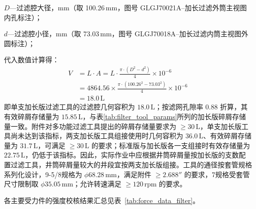 $D$---过滤腔大径，mm（取 100.26\,mm，图号 GLGJ70021A--加长过滤外筒主视图内孔标注）；

$d$---过滤腔小径，mm（取 73.03\,mm，图号 GLGJ70018A--加长过滤内筒主视图外圆标注）；


代入数值计算得：
\begin{equation}
    \begin{aligned}
        V &= L \cdot A = L \cdot \frac{\pi \cdot (D^2 - d^2)}{4} \times 10^{-6} \\
        &= 4864.56 \times \frac{\pi \cdot (100.26^2 - 73.03^2)}{4} \times 10^{-6} \\
        &= 18.0\,\text{L}
    \end{aligned}
\end{equation}
即单支加长版过滤工具的过滤腔几何容积为 $18.0\,\text{L}$；按滤网孔隙率 $0.88$ 折算，其有效碎屑存储量为 $15.85\,\text{L}$，与表\ref{tab:filter_tool_params}所列的加长版碎屑存储量一致。附件对多功能过滤工具提出的碎屑存储量要求为 $\ge 30\,\text{L}$，单支加长版工具尚未达到该指标，两支加长版工具组接使用时几何容积为 $36.0\,\text{L}$、有效碎屑存储量为 $31.7\,\text{L}$，可满足 $\ge 30\,\text{L}$ 的要求；标准版与加长版各一支组接时有效存储量为 $22.75\,\text{L}$，仍低于该指标。因此，实际作业中应根据井筒碎屑量按加长版的支数配置过滤工具，井筒碎屑量较大的井段宜按两支加长版组接。工具的通径按套管规格系列化设计，9-5/8\inch 规格为 $\phi 68.28$\,mm，满足附件 $\ge 2.688''$ 的要求，7\inch 规格受套管尺寸限制取 $\phi 35.05$\,mm；允许转速满足 $\ge 120$\,rpm 的要求。


各主要受力件的强度校核结果汇总见表~\ref{tab:force_data_filter}。

